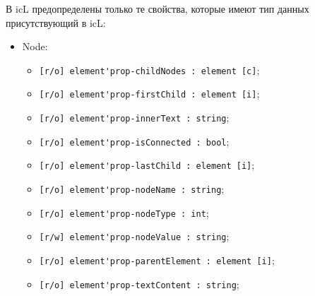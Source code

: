 \documentclass[a4paper, 14pt]{extarticle}
\newenvironment{icItems}
	{ \begin{itemize} [noitemsep,nolistsep] }
	{ \end{itemize} }
\begin{document}
В icL предопределены только те свойства, которые имеют тип данных присутствующий в icL:
\begin{icItems}
	\item Node:	
	\begin{icItems}
		\item \lstinline|[r/o] element'prop-childNodes : element [c]|;
		\item \lstinline|[r/o] element'prop-firstChild : element [i]|;
		\item \lstinline|[r/o] element'prop-innerText : string|;
		\item \lstinline|[r/o] element'prop-isConnected : bool|;
		\item \lstinline|[r/o] element'prop-lastChild : element [i]|;
		\item \lstinline|[r/o] element'prop-nodeName : string|;
		\item \lstinline|[r/o] element'prop-nodeType : int|;
		\item \lstinline|[r/w] element'prop-nodeValue : string|;
		\item \lstinline|[r/o] element'prop-parentElement : element [i]|;
		\item \lstinline|[r/o] element'prop-textContent : string|;
	\end{icItems}
	

\end{icItems}
\end{document}
